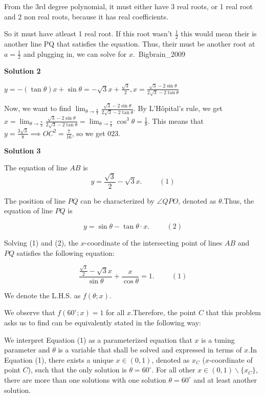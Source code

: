 \begin{enumerate}
 From the 3rd degree polynomial, it must either have 3 real roots, or 1 real root and 2 non real roots, because it has real coefficients.

 So it must have atleast 1 real root. If this root wasn't $\frac{1}{2}$ this would mean their is another line PQ that satisfies the equation. Thus, their must be another root at $a=\frac{1}{2}$ and plugging in, we can solve for $x$.~Bigbrain\_2009

 



\textbf{Solution 2}

$y=-(\tan \theta) x+\sin \theta=-\sqrt{3}x+\frac{\sqrt{3}}{2}, x=\frac{\sqrt{3}-2\sin \theta}{2\sqrt{3}-2\tan \theta}$

 Now, we want to find $\lim_{\theta\to\frac{\pi}{3}}\frac{\sqrt{3}-2\sin \theta}{2\sqrt{3}-2\tan \theta}$. By L'Hôpital's rule, we get $x=\lim_{\theta\to\frac{\pi}{3}}\frac{\sqrt{3}-2\sin \theta}{2\sqrt{3}-2\tan \theta}=\lim_{\theta\to\frac{\pi}{3}}\cos^3{\theta}=\frac{1}{8}$. This means that $y=\frac{3\sqrt{3}}{8}\implies OC^2=\frac{7}{16}$, so we get $\boxed{023}$.

 



\textbf{Solution 3}

The equation of line $AB$ is 
 \[ y = \frac{\sqrt{3}}{2}  - \sqrt{3} x.  \hspace{1cm} (1) \]

 The position of line  $PQ$ can be characterized by $\angle QPO$, denoted as $\theta$.Thus, the equation of line $PQ$ is

 
 \[ y = \sin \theta - \tan \theta \cdot x . \hspace{1cm} (2) \]

 Solving (1) and (2), the $x$-coordinate of the intersecting point of lines $AB$ and $PQ$ satisfies the following equation:

 
 \[ \frac{\frac{\sqrt{3}}{2} - \sqrt{3} x}{\sin \theta} + \frac{x}{\cos \theta} = 1 . \hspace{1cm} (1) \]

 We denote the L.H.S. as $f \left( \theta; x \right)$.

 We observe that $f \left( 60^\circ ; x \right) = 1$ for all $x$.Therefore, the point $C$ that this problem asks us to find can be equivalently stated in the following way:

 We interpret Equation (1) as a parameterized equation that $x$ is a tuning parameter and $\theta$ is a variable that shall be solved and expressed in terms of $x$.In Equation (1), there exists a unique $x \in \left( 0, 1 \right)$, denoted as $x_C$ ($x$-coordinate of point $C$), such that the only solution is $\theta = 60^\circ$. For all other $x \in \left( 0, 1 \right) \backslash \{ x_C \}$, there are more than one solutions with one solution $\theta = 60^\circ$ and at least another solution.


\end{enumerate}
